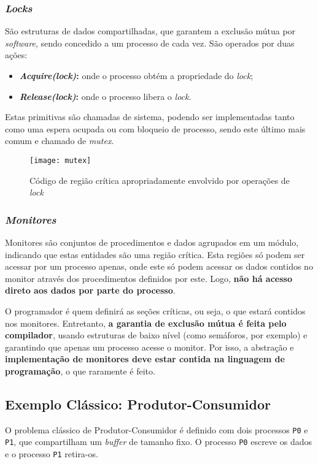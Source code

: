 \subsubsection{\textit{Locks}}
São estruturas de dados compartilhadas, que garantem a exclusão mútua por \textit{software}, sendo concedido a um processo de cada vez. São operados por duas ações:

\begin{itemize}
  \item \textbf{\textit{Acquire(lock)}:} onde o processo obtém a propriedade do \textit{lock};

  \item \textbf{\textit{Release(lock)}:} onde o processo libera o \textit{lock}.
\end{itemize}

Estas primitivas são chamadas de sistema, podendo ser implementadas tanto como uma espera ocupada ou com bloqueio de processo, sendo este último mais comum e chamado de \textit{mutex}.

\begin{figure}
  \texttt{[image: mutex]}
  \caption{Código de região crítica apropriadamente envolvido por operações de \textit{lock}}
  \label{fig:mutex}
\end{figure}


\subsubsection{\textit{Monitores}}
Monitores são conjuntos de procedimentos e dados agrupados em um módulo, indicando que estas entidades são uma região crítica. Esta regiões só podem ser acessar por um processo apenas, onde este só podem acessar os dados contidos no monitor através dos procedimentos definidos por este. Logo, \textbf{não há acesso direto aos dados por parte do processo}.

O programador é quem definirá as seções críticas, ou seja, o que estará contidos nos monitores. Entretanto, \textbf{a garantia de exclusão mútua é feita pelo compilador}, usando estruturas de baixo nível (como semáforos, por exemplo) e garantindo que apenas um processo acesse o monitor. Por isso, a abstração e \textbf{implementação de monitores deve estar contida na linguagem de programação}, o que raramente é feito.








\subsection{Exemplo Clássico: Produtor-Consumidor}
O problema clássico de Produtor-Consumidor é definido com dois processos \texttt{P0} e \texttt{P1}, que compartilham um \textit{buffer} de tamanho fixo. O processo \texttt{P0} escreve os dados e o processo \texttt{P1} retira-os.

